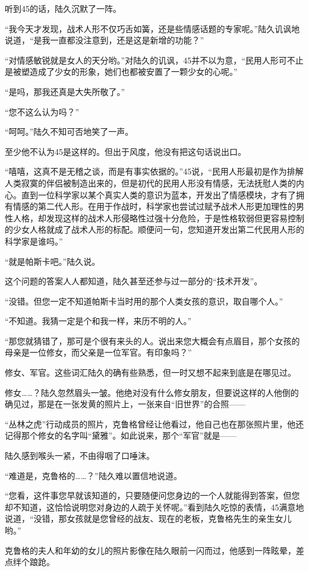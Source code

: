 听到45的话，陆久沉默了一阵。

“我今天才发现，战术人形不仅巧舌如簧，还是些情感话题的专家呢。”陆久讥讽地说道，“是我一直都没注意到，还是这是新增的功能？”

“对情感敏锐就是女人的天分哟。”对陆久的讥讽，45并不以为意，“民用人形可不止是被塑造成了少女的形象，她们也都被安置了一颗少女的心呢。”

“是吗，那我还真是大失所敬了。”

“您不这么认为吗？”

“呵呵。”陆久不知可否地笑了一声。

至少他不认为45是这样的。但出于风度，他没有把这句话说出口。

“嘻嘻，这真不是无稽之谈，而是有事实依据的。”45说，“民用人形最初是作为排解人类寂寞的伴侣被制造出来的，但是初代的民用人形没有情感，无法抚慰人类的内心。直到一位科学家以某个真实人类的意识为蓝本，开发出了情感模块，才有了拥有情感的第二代人形。在用于作战时，科学家也尝试过赋予战术人形更加理性的男性人格，却发现这样的战术人形侵略性过强十分危险，于是性格软弱但更容易控制的少女人格就成了战术人形的标配。顺便问一句，您知道开发出第二代民用人形的科学家是谁吗。”

“就是帕斯卡吧。”陆久说。

这个问题的答案人人都知道，陆久甚至还参与过一部分的“技术开发”。

“没错。但您一定不知道帕斯卡当时用的那个人类女孩的意识，取自哪个人。”

“不知道。我猜一定是个和我一样，来历不明的人。”

“那您就猜错了，那可是个很有来头的人。说出来您大概会有点眉目，那个女孩的母亲是一位修女，而父亲是一位军官。有印象吗？”

修女、军官。这些词汇陆久的确有些熟悉，但一时又想不起来到底是在哪见过。

修女……？陆久忽然眉头一皱。他绝对没有什么修女朋友，但要说这样的人他倒的确见过，那是在一张发黄的照片上，一张来自“旧世界”的合照——

“丛林之虎”行动成员的照片，克鲁格曾经让他看过，他自己也在那张照片里，他还记得那个修女的名字叫“黛雅”。如此说来，那个“军官”就是——

陆久感到喉头一紧，不由得咽了口唾沫。

“难道是，克鲁格的……？”陆久难以置信地说道。

“您看，这件事您早就该知道的，只要随便问您身边的一个人就能得到答案，但您却不知道，这恰恰说明您对身边的人疏于关怀呢。”看到陆久吃惊的表情，45满意地说道，“没错，那女孩就是您曾经的战友、现在的老板，克鲁格先生的亲生女儿哟。”

克鲁格的夫人和年幼的女儿的照片影像在陆久眼前一闪而过，他感到一阵眩晕，差点绊个踉跄。

